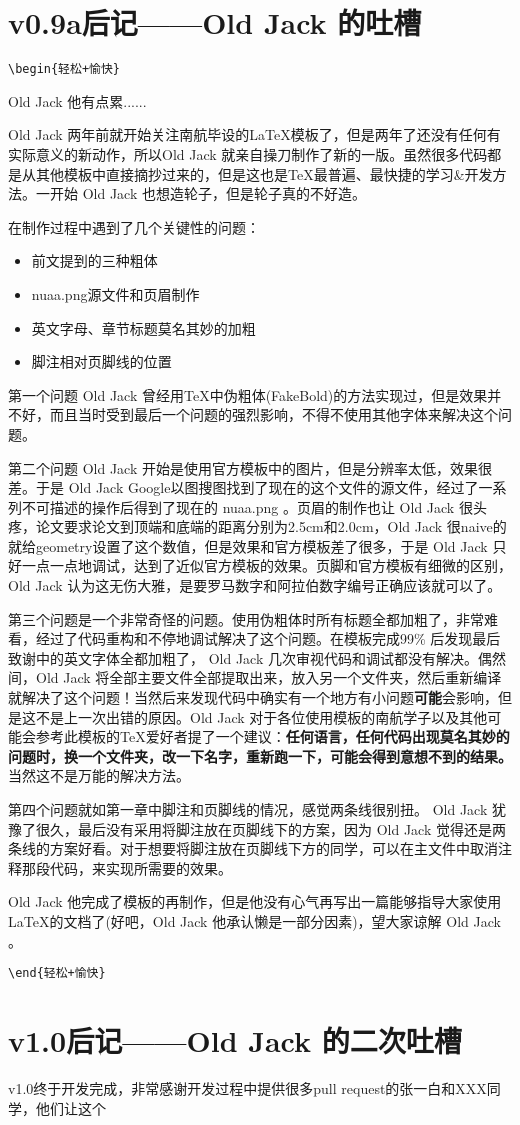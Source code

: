 \chapter{v0.9a后记——Old Jack 的吐槽}

\verb!\begin{轻松+愉快}!

Old Jack 他有点累......

Old Jack 两年前就开始关注南航毕设的\LaTeX 模板了，但是两年了还没有任何有实际意义的新动作，所以Old Jack 就亲自操刀制作了新的一版。虽然很多代码都是从其他模板中直接摘抄过来的，但是这也是\TeX 最普遍、最快捷的学习\&开发方法。一开始 Old Jack 也想造轮子，但是轮子真的不好造。

在制作过程中遇到了几个关键性的问题：
\begin{itemize}
  \item 前文提到的三种粗体
  \item nuaa.png源文件和页眉制作
  \item 英文字母、章节标题莫名其妙的加粗
  \item 脚注相对页脚线的位置
\end{itemize}

第一个问题 Old Jack 曾经用\TeX 中伪粗体(FakeBold)的方法实现过，但是效果并不好，而且当时受到最后一个问题的强烈影响，不得不使用其他字体来解决这个问题。

第二个问题 Old Jack 开始是使用官方模板中的图片，但是分辨率太低，效果很差。于是 Old Jack Google以图搜图找到了现在的这个文件的源文件，经过了一系列不可描述的操作后得到了现在的 nuaa.png 。页眉的制作也让 Old Jack 很头疼，论文要求论文到顶端和底端的距离分别为2.5cm和2.0cm，Old Jack 很naive的就给geometry设置了这个数值，但是效果和官方模板差了很多，于是 Old Jack 只好一点一点地调试，达到了近似官方模板的效果。页脚和官方模板有细微的区别，Old Jack 认为这无伤大雅，是要罗马数字和阿拉伯数字编号正确应该就可以了。

第三个问题是一个非常奇怪的问题。使用伪粗体时所有标题全都加粗了，非常难看，经过了代码重构和不停地调试解决了这个问题。在模板完成99\% 后发现最后致谢中的英文字体全都加粗了， Old Jack 几次审视代码和调试都没有解决。偶然间，Old Jack 将全部主要文件全部提取出来，放入另一个文件夹，然后重新编译就解决了这个问题！当然后来发现代码中确实有一个地方有小问题\textbf{可能}会影响，但是这不是上一次出错的原因。Old Jack 对于各位使用模板的南航学子以及其他可能会参考此模板的\TeX 爱好者提了一个建议：\textbf{任何语言，任何代码出现莫名其妙的问题时，换一个文件夹，改一下名字，重新跑一下，可能会得到意想不到的结果。}当然这不是万能的解决方法。

第四个问题就如第一章中脚注和页脚线的情况，感觉两条线很别扭。 Old Jack 犹豫了很久，最后没有采用将脚注放在页脚线下的方案，因为 Old Jack 觉得还是两条线的方案好看。对于想要将脚注放在页脚线下方的同学，可以在主文件中取消注释那段代码，来实现所需要的效果。

Old Jack 他完成了模板的再制作，但是他没有心气再写出一篇能够指导大家使用\LaTeX 的文档了(好吧，Old Jack 他承认懒是一部分因素)，望大家谅解 Old Jack 。

\verb!\end{轻松+愉快}!

\chapter{v1.0后记——Old Jack 的二次吐槽}
v1.0终于开发完成，非常感谢开发过程中提供很多pull request的张一白和XXX同学，他们让这个
